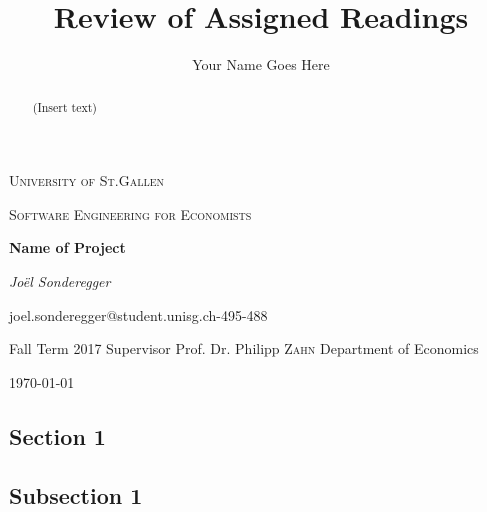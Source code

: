 \documentclass[a4paper,american,12pt]{article}
\title{Review of Assigned Readings}
\author{Your Name Goes Here}
\begin{document}
    \begin{titlepage}
        \centering
        {\scshape\LARGE University of St.Gallen \par}
        \vspace{1cm}
        {\scshape\Large Software Engineering for Economists \par}
        \vspace{1.3cm}
        {\huge\bfseries Name of Project  \par}
        \vspace{3cm}
        {\Large\itshape Joël Sonderegger\par}
        \begin{spacing}{1.2}
        joel.sonderegger{@}student.unisg.ch-495-488\linebreak
        
        \vspace{1cm}
        Fall Term 2017
        \vfill
        Supervisor
        \linebreak
        Prof. Dr. Philipp \textsc{Zahn}
        \linebreak
        Department of Economics
        \end{spacing}
    
        \vfill
    
     {\large \today\par}
    
    \end{titlepage}
    \begin{abstract}
    \begin{spacing}{1.5}
    
  (Insert text)

    \end{spacing}
    
    \end{abstract}

    \clearpage
    \tableofcontents
    
    \clearpage
    
    \listoffigures
    
    \clearpage

\begin{spacing}{1.2}
\cleardoublepage{}
\section{Section 1}

\subsection{Subsection 1}


\end{spacing}
\clearpage

\printbibliography
\end{document}
